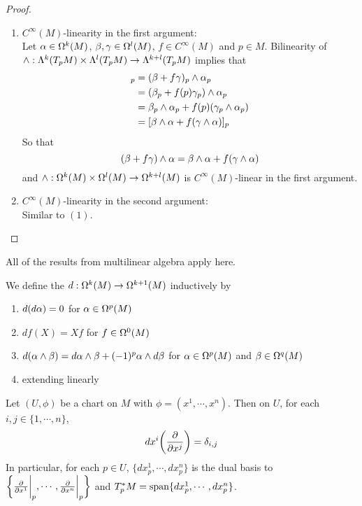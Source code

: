 \documentclass{book}
\begin{document}
	\begin{proof}\
	\begin{enumerate}
	\item 
	$C^{\infty}(M)$-linearity in the first argument:\\
	Let $\alpha \in \Omega^k(M)$, $\beta, \gamma \in \Omega^l(M)$, $f \in C^{\infty}(M)$ and $p \in M$. Bilinearity of $\wedge: \Lambda^k(T_pM) \times \Lambda^l(T_pM) \rightarrow \Lambda^{k+l}(T_pM)$ implies that
	\begin{align*}
	[(\be + f \gam ) \wedge \al]_p 
	&= (\be + f \gam)_p \wedge \al_p  \\
	&=(\be_p + f(p) \gam_p) \wedge \al_p \\
	&= \be_p \wedge \al_p + f(p)( \gam_p \wedge \al_p) \\
	&=  [\be \wedge \al + f (\gam \wedge \al)]_p \\
	\end{align*}
	So that $$(\beta + f \gamma ) \wedge \alpha = \beta \wedge \alpha  + f  (\gamma \wedge \alpha)$$ and $\wedge: \Omega^k(M) \times \Omega^l(M) \rightarrow \Omega^{k+l}(M) $ is $C^{\infty}(M)$-linear in the first argument. 
	\item $C^{\infty}(M)$-linearity in the second argument:\\
	Similar to $(1)$.
	\end{enumerate}
	\end{proof}
	
	\begin{note}
		All of the results from multilinear algebra apply here.
	\end{note}

	\begin{defn}
		We define the  $d: \Omega^k(M) \rightarrow \Omega^{k+1}(M)$ inductively by 
		\begin{enumerate}
			\item $d(d \alpha) = 0$ for $\alpha \in \Omega^p(M)$
			\item $df(X) = Xf$ for $f \in \Omega^0(M)$
			\item $d(\alpha \wedge \beta) = d\alpha \wedge \beta + (-1)^p \alpha \wedge d\beta$ for $\alpha \in \Omega^p(M)$ and $\beta \in \Omega^q(M)$
			\item extending linearly
		\end{enumerate}
	\end{defn}

	\begin{ex}
		Let $(U, \phi)$ be a chart on $M$ with $\phi = (x^1, \cdots, x^n)$. Then on $U$, for each $i,j \in \{1, \cdots, n\}$, $$dx^i\bigg(\frac{\partial}{\partial x^j} \bigg) = \delta_{i,j}$$ 
		In particular, for each $p \in U$, $\{dx^1_p, \cdots, dx^n_p \}$ is the dual basis to $\bigg \{ \frac{\partial}{\partial x^1} \bigg|_p, \cdots, \frac{\partial}{\partial x^n} \bigg|_p \bigg \}$ and $T_p^*M = \operatorname{span}\{dx^1_p, \cdots, dx^n_p\}$.
	\end{ex}
\end{document}
